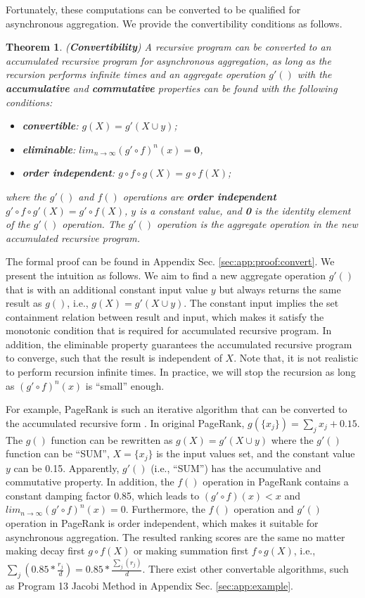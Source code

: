 \documentclass{vldb}
\newtheorem{theorem}{Theorem}
\begin{document}
Fortunately, these computations can be converted to be qualified for asynchronous aggregation. We provide the convertibility conditions as follows.

\begin{theorem}
	\label{th:convert}
	(\textbf{Convertibility}) A recursive program can be converted to an accumulated recursive program for asynchronous aggregation, as long as the recursion performs infinite times and an aggregate operation $g'()$ with the \textbf{accumulative} and \textbf{commutative} properties can be found with the following conditions:
	\begin{itemize}
		\item \textbf{convertible}: $g(X)=g'(X\cup y)$;
		\item \textbf{eliminable}: $lim_{n\rightarrow\infty}(g'\circ f)^n(x)=\textbf{0}$,
\item \textbf{order independent}: $g\circ f\circ g(X)=g\circ f(X)$;
	\end{itemize}
	where the $g'()$ and $f()$ operations are \textbf{order independent} $g'\circ f\circ g'(X)=g'\circ f(X)$, $y$ is a constant value, and \textbf{0} is the identity element of the $g'()$ operation. The $g'()$ operation is the aggregate operation in the new accumulated recursive program.
\end{theorem}

The formal proof can be found in Appendix Sec. \ref{sec:app:proof:convert}. We present the intuition as follows. We aim to find a new aggregate operation $g'()$ that is with an additional constant input value $y$ but always returns the same result as $g()$, i.e., $g(X)=g'(X\cup y)$. The constant input implies the set containment relation between result and input, which makes it satisfy the monotonic condition that is required for accumulated recursive program. In addition, the eliminable property guarantees the accumulated recursive program to converge, such that the result is independent of $X$. Note that, it is not realistic to perform recursion infinite times. In practice, we will stop the recursion as long as $(g'\circ f)^n(x)$ is ``small'' enough.

For example, PageRank is such an iterative algorithm that can be converted to the accumulated recursive form \cite{maiter}. In original PageRank, $g(\{x_j\})=\sum_j{x_j}+0.15$. The $g()$ function can be rewritten as $g(X)=g'(X\cup y)$ where the $g'()$ function can be ``SUM'', $X=\{x_j\}$ is the input values set, and the constant value $y$ can be 0.15. Apparently, $g'()$ (i.e., ``SUM'') has the accumulative and commutative property. In addition, the $f()$ operation in PageRank contains a constant damping factor 0.85, which leads to $(g'\circ f)(x)<x$ and $lim_{n\rightarrow\infty}(g'\circ f)^n(x)=0$. Furthermore, the $f()$ operation and $g'()$ operation in PageRank is order independent, which makes it suitable for asynchronous aggregation. The resulted ranking scores are the same no matter making decay first $g\circ f(X)$ or making summation first $f\circ g(X)$, i.e., $\sum_j(0.85*\frac{r_j}{d})=0.85*\frac{\sum_j(r_j)}{d}$. There exist other convertable algorithms, such as Program 13 Jacobi Method in Appendix Sec. \ref{sec:app:example}.
\end{document}
